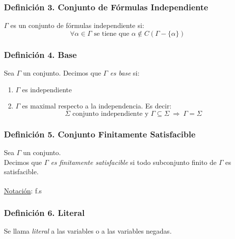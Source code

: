 \documentclass{article}
\newcommand{\Rightarrows}{\: \Rightarrow \:}            %
\begin{document}
\subsubsection*{Definición 3. Conjunto de Fórmulas Independiente}
$\Gamma$ es un conjunto de fórmulas independiente si:
\begin{equation*}
    \forall \alpha \in \Gamma \text{ se tiene que } \alpha \notin C(\Gamma - \{\alpha\})
\end{equation*}

\subsubsection*{Definición 4. Base}
Sea $\Gamma$ un conjunto. 
Decimos que \emph{$\Gamma$ es base} si:
\begin{enumerate}
    \item $\Gamma$ es independiente
    \item $\Gamma$ es maximal respecto a la independencia. Es decir:
    \begin{equation*}
        \Sigma \text{ conjunto independiente y } \Gamma \subseteq \Sigma \Rightarrows \Gamma = \Sigma
    \end{equation*}
\end{enumerate}

\subsubsection*{Definición 5. Conjunto Finitamente Satisfacible}
Sea $\Gamma$ un conjunto.
\\Decimos que \emph{$\Gamma$ es finitamente satisfacible} si todo subconjunto finito de $\Gamma$ es satisfacible.
\\\\\underline{Notación}: f.s

\subsubsection*{Definición 6. Literal}
Se llama \emph{literal} a las variables o a las variables negadas.
\end{document}

